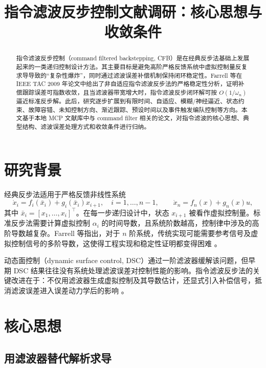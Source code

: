 \documentclass[UTF8,a4paper,11pt,fontset=fandol]{ctexart}
\title{指令滤波反步控制文献调研：核心思想与收敛条件}
\author{}
\date{}
\begin{document}
\maketitle

\begin{abstract}
指令滤波反步控制（command filtered backstepping, CFB）是在经典反步法基础上发展起来的一类递归控制设计方法。其主要目标是避免高阶严格反馈系统中虚拟控制量反复求导导致的``复杂性爆炸''，同时通过滤波误差补偿机制保持闭环稳定性。Farrell 等在 IEEE TAC 2009 年论文中给出了非自适应指令滤波反步法的严格稳定性分析，证明补偿跟踪误差可指数收敛，且当滤波器带宽增大时，指令滤波反步闭环解可按 $O(1/\omega_n)$ 逼近标准反步解。此后，研究逐步扩展到有限时间、自适应、模糊/神经逼近、状态约束、故障容错、未知控制方向、渐近跟踪、预设时间以及事件触发编队控制等方向。本文基于本地 MCP 文献库中与 command filter 相关的论文，对指令滤波的核心思想、典型结构、滤波误差处理方式和收敛条件进行归纳。
\end{abstract}

\section{研究背景}

经典反步法适用于严格反馈非线性系统
\begin{equation}
  \dot{x}_i=f_i(\bar{x}_i)+g_i(\bar{x}_i)x_{i+1},\quad i=1,\ldots,n-1,
  \qquad
  \dot{x}_n=f_n(x)+g_n(x)u ,
\end{equation}
其中 $\bar{x}_i=[x_1,\ldots,x_i]^\top$。在每一步递归设计中，状态 $x_{i+1}$ 被看作虚拟控制量。标准反步法需要计算虚拟控制 $\alpha_i$ 的时间导数，且系统阶数越高，控制律中涉及的高阶导数越复杂。Farrell 等指出，对于 $n$ 阶系统，传统实现可能需要参考信号及虚拟控制信号的多阶导数，这使得工程实现和稳定性证明都变得困难 \cite{Farrell2009CFB}。

动态面控制（dynamic surface control, DSC）通过一阶滤波器缓解该问题，但早期 DSC 结果往往没有系统处理滤波误差对控制性能的影响。指令滤波反步法的关键改进在于：不仅用滤波器生成虚拟控制及其导数估计，还显式引入补偿信号，抵消滤波误差进入误差动力学后的影响 \cite{Farrell2009CFB,Yu2018FiniteTime}。

\section{核心思想}

\subsection{用滤波器替代解析求导}
\end{document}
